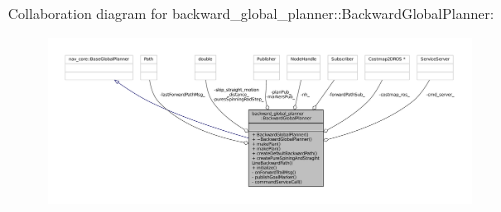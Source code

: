 Collaboration diagram for backward\+\_\+global\+\_\+planner\+:\+:Backward\+Global\+Planner\+:
\nopagebreak
\begin{figure}[H]
\begin{center}
\leavevmode
\includegraphics[width=350pt]{classbackward__global__planner_1_1BackwardGlobalPlanner__coll__graph}
\end{center}
\end{figure}
